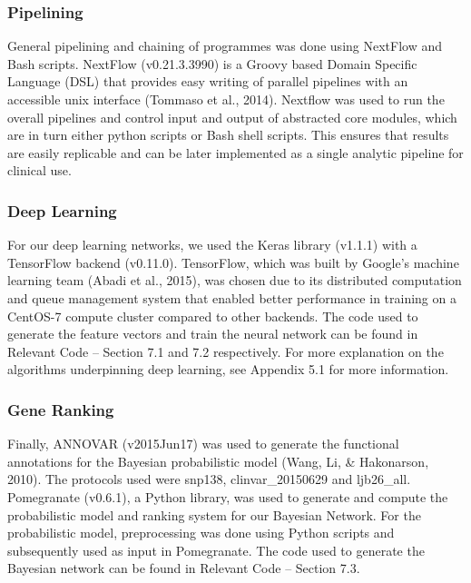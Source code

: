 \documentclass{article}
\begin{document}
\subsubsection{Pipelining}
General pipelining and chaining of programmes was done using NextFlow and Bash scripts. NextFlow (v0.21.3.3990) is a Groovy based Domain Specific Language (DSL) that provides easy writing of parallel pipelines with an accessible unix interface (Tommaso et al., 2014). Nextflow was used to run the overall pipelines and control input and output of abstracted core modules, which are in turn either python scripts or Bash shell scripts. This ensures that results are easily replicable and can be later implemented as a single analytic pipeline for clinical use.
\subsubsection{Deep Learning}
For our deep learning networks, we used the Keras library (v1.1.1) with a TensorFlow backend (v0.11.0). TensorFlow, which was built by Google's machine learning team (Abadi et al., 2015), was chosen due to its distributed computation and queue management system that enabled better performance in training on a CentOS-7 compute cluster compared to other backends. The code used to generate the feature vectors and train the neural network can be found in Relevant Code -- Section 7.1 and 7.2 respectively. For more explanation on the algorithms underpinning deep learning, see Appendix 5.1 for more information. 
\subsubsection{Gene Ranking}
Finally, ANNOVAR (v2015Jun17) was used to generate the functional annotations for the Bayesian probabilistic model (Wang, Li, \& Hakonarson, 2010). The protocols used were snp138, clinvar\_20150629 and ljb26\_all. Pomegranate (v0.6.1), a Python library, was used to generate and compute the probabilistic model and ranking system for our Bayesian Network. For the probabilistic model, preprocessing was done using Python scripts and subsequently used as input in Pomegranate. The code used to generate the Bayesian network can be found in Relevant Code -- Section 7.3.
\end{document}

